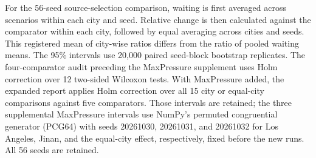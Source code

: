 For the 56-seed source-selection comparison, waiting is first averaged across scenarios within each city and seed. Relative change is then calculated against the comparator within each city, followed by equal averaging across cities and seeds. This registered mean of city-wise ratios differs from the ratio of pooled waiting means. The 95\% intervals use 20,000 paired seed-block bootstrap replicates. The four-comparator audit preceding the MaxPressure supplement uses Holm correction over 12 two-sided Wilcoxon tests. With MaxPressure added, the expanded report applies Holm correction over all 15 city or equal-city comparisons against five comparators. Those intervals are retained; the three supplemental MaxPressure intervals use NumPy's permuted congruential generator (PCG64) with seeds 20261030, 20261031, and 20261032 for Los Angeles, Jinan, and the equal-city effect, respectively, fixed before the new runs. All 56 seeds are retained.

